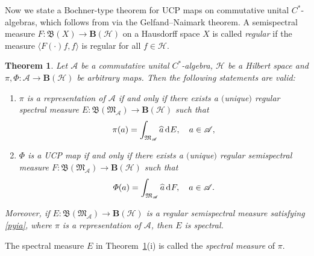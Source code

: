 \documentclass[reqno]{amsproc}
\numberwithin{equation}{section}
\newtheorem{theorem}{Theorem}[section]
\theoremstyle{remark}
\newcommand*{\ascr}{\mathscr{A}}
\newcommand*{\hh}{\mathcal{H}}
\newcommand*{\borel}{\mathfrak{B}}
\newcommand*{\D}{\mathrm{d\hspace{.1ex}}}
\theoremstyle{definition}
\newcommand*{\ogr}{\boldsymbol{B}}
\begin{document}
Now we state a Bochner-type theorem for UCP maps on
commutative unital $C^*$-algebras, which follows from
\cite[Proposition~4.5]{Paul02} via the
Gelfand--Naimark theorem. A semispectral measure
$F\colon \borel(X) \to \ogr(\hh)$ on a Hausdorff space
$X$ is called {\em regular} if the measure $\langle
F(\cdot)f,f\rangle$ is regular for all $f \in \hh$.
   \begin{theorem} \label{soptw}
Let $\ascr$ be a commutative unital $C^*$-algebra,
$\hh$ be a Hilbert space and $\pi,\varPhi\colon \ascr
\to \ogr(\hh)$ be arbitrary maps. Then the following
statements are valid{\em :}
   \begin{enumerate}
   \item[(i)] $\pi$ is a
representation of $\ascr$ if and only if
there exists a $($unique$)$ regular spectral
measure $E\colon
\borel(\mathfrak{M}_{\ascr}) \to \ogr(\hh)$
such that
   \begin{align} \label{pyia}
\pi(a) =\int_{\mathfrak{M}_{\ascr}}
\widehat{a} \, \D E,\quad a \in \ascr,
   \end{align}
   \item[(ii)] $\varPhi$ is a
UCP map if and only if there exists a
$($unique$)$ regular semispectral measure
$F\colon \borel(\mathfrak{M}_{\ascr}) \to
\ogr(\hh)$ such that
   \begin{align*}
\varPhi(a) =\int_{\mathfrak{M}_{\ascr}}
\widehat{a} \, \D F,\quad a \in \ascr.
   \end{align*}
   \end{enumerate}
Moreover, if $E\colon \borel(\mathfrak{M}_{\ascr}) \to
\ogr(\hh)$ is a regular semispectral measure
satisfying {\em \eqref{pyia}}, where $\pi$ is a
representation of $\ascr$, then $E$ is spectral.
   \end{theorem}
The spectral measure $E$ in Theorem~\ref{soptw}(i) is
called the {\em spectral measure} of $\pi$.
\end{document}
